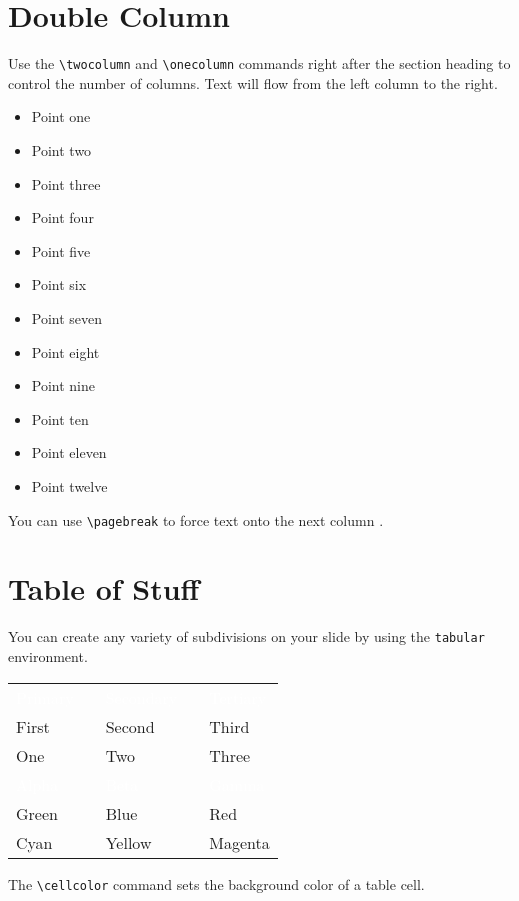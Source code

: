 \documentclass{antclass}
\begin{document}
\section{Double Column}\twocolumn\raggedright

Use the \verb|\twocolumn| and \verb|\onecolumn| commands right after the section
heading to control the number of columns. Text will flow from the left column to
the right.
\begin{itemize}
  \item Point one
  \item Point two
  \item Point three
  \item Point four
  \item Point five
  \item Point six
  \item Point seven
  \item Point eight
  \item Point nine
  \item Point ten
  \item Point eleven
  \item Point twelve
\end{itemize}
You can use \verb|\pagebreak| to force text onto the next column \cite{exampleCitation}.

\section{Table of Stuff}

You can create any variety of subdivisions on your slide by using the
\verb|tabular| environment.
\begin{center}
  \begin{tabular}{C{0.25\textwidth}cC{0.25\textwidth}cC{0.25\textwidth}}
    \textcolor{white}{Primary}\strut   &  &
    \textcolor{white}{Secondary}\strut &  &
    \textcolor{white}{Tertiary}\strut                           \\
    First                                                &  & Second &  & Third   \\
    One                                                  &  & Two    &  & Three   \\[1em]
    \textcolor{white}{Alpha}\strut     &  &
    \textcolor{white}{Beta}\strut      &  &
    \textcolor{white}{Gamma}\strut                              \\
    Green                                                &  & Blue   &  & Red     \\
    Cyan                                                 &  & Yellow &  & Magenta
  \end{tabular}
\end{center}
The \verb|\cellcolor| command sets the background color of a table cell.
\end{document}
